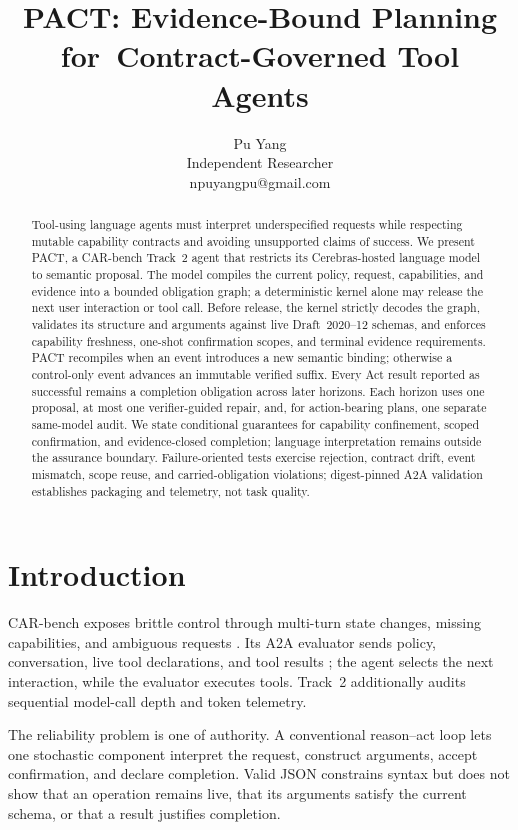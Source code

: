 \documentclass{article}
\title{PACT: Evidence-Bound Planning for\
Contract-Governed Tool Agents}
\author{
Pu Yang\\
\affiliations
Independent Researcher\\
\emails
npuyangpu@gmail.com
}
\begin{document}
\maketitle

\begin{abstract}
Tool-using language agents must interpret underspecified requests while
respecting mutable capability contracts and avoiding unsupported claims of
success.  We present PACT, a CAR-bench Track~2 agent that restricts its
Cerebras-hosted language model to semantic proposal.  The model compiles the
current policy, request, capabilities, and evidence into a bounded obligation
graph; a deterministic kernel alone may release the next user interaction or
tool call.  Before release, the kernel strictly decodes the graph, validates
its structure and arguments against live Draft~2020--12 schemas, and enforces
capability freshness, one-shot confirmation scopes, and terminal evidence
requirements.  PACT recompiles when an event introduces a new semantic
binding; otherwise a control-only event advances an immutable verified suffix.
Every Act result reported as successful remains a completion obligation across
later horizons.  Each horizon uses one proposal, at most one verifier-guided
repair, and, for action-bearing plans, one separate same-model audit.  We state
conditional guarantees for capability confinement, scoped confirmation, and
evidence-closed completion; language interpretation remains outside the
assurance boundary.  Failure-oriented tests exercise rejection, contract drift,
event mismatch, scope reuse, and carried-obligation violations; digest-pinned
A2A validation establishes packaging and telemetry, not task quality.
\end{abstract}

\section{Introduction}

CAR-bench exposes brittle control through multi-turn state changes, missing
capabilities, and ambiguous requests \cite{kirmayr2026car}.  Its A2A evaluator
sends policy, conversation, live tool declarations, and tool results
\cite{a2a2026}; the agent selects the next interaction, while the evaluator
executes tools.  Track~2 additionally audits sequential model-call depth and
token telemetry.

The reliability problem is one of authority.  A conventional reason--act loop
lets one stochastic component interpret the request, construct arguments,
accept confirmation, and declare completion.  Valid JSON constrains syntax but
does not show that an operation remains live, that its arguments satisfy the
current schema, or that a result justifies completion.
\end{document}
